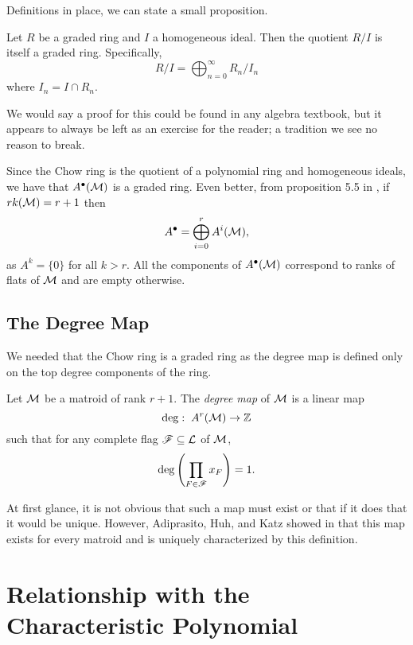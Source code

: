 \documentclass[12pt,oneside]{../../sfsuthesis}
\begin{document}
Definitions in place, we can state a small proposition.
\begin{proposition}
    Let \( R \) be a graded ring and \( I \) a homogeneous ideal.
    Then the quotient \( R/I \) is itself a graded ring.
    Specifically,
    \[
        R/I = \bigoplus_{n=0}^\infty R_n/I_n
    \]
    where \( I_n = I \cap R_n \).
\end{proposition}
We would say a proof for this could be found in any algebra textbook, but it appears to always be left as an exercise for the reader; a tradition we see no reason to break.

Since the Chow ring is the quotient of a polynomial ring and homogeneous ideals, we have that \( A^\bullet(\mathcal{M}) \) is a graded ring.
Even better, from proposition 5.5 in \cite{adiprasitoHodgeTheoryCombinatorial2018}, if \( rk(\mathcal{M}) = r + 1 \) then
\[
    A^\bullet = \bigoplus_{i=0}^r A^i(\mathcal{M}),
\]
as \( A^k = \{ 0 \} \) for all \( k > r \).
All the components of \( A^\bullet(\mathcal{M}) \) correspond to ranks of flats of \( \mathcal{M} \) and are empty otherwise.


\subsection{The Degree Map}

We needed that the Chow ring is a graded ring as the degree map is defined only on the top degree components of the ring.
\begin{definition}\label{def:degMap}
    Let \( \mathcal{M} \) be a matroid of rank \( r + 1 \).
    The \emph{degree map} of \( \mathcal{M} \) is a linear map
    \[
        \deg:\; A^r(\mathcal{M}) \to \mathbb{Z}
    \]
    such that for any complete flag \( \mathscr{F} \subseteq \mathcal{L} \) of \( \mathcal{M} \),
    \[
        \deg \left( \prod_{F \in \mathscr{F}}x_F \right) = 1.
    \]
\end{definition}

At first glance, it is not obvious that such a map must exist or that if it does that it would be unique.
However, Adiprasito, Huh, and Katz showed in \cite{adiprasitoHodgeTheoryCombinatorial2018} that this map exists for every matroid and is uniquely characterized by this definition.

\section{Relationship with the Characteristic Polynomial}
\end{document}
